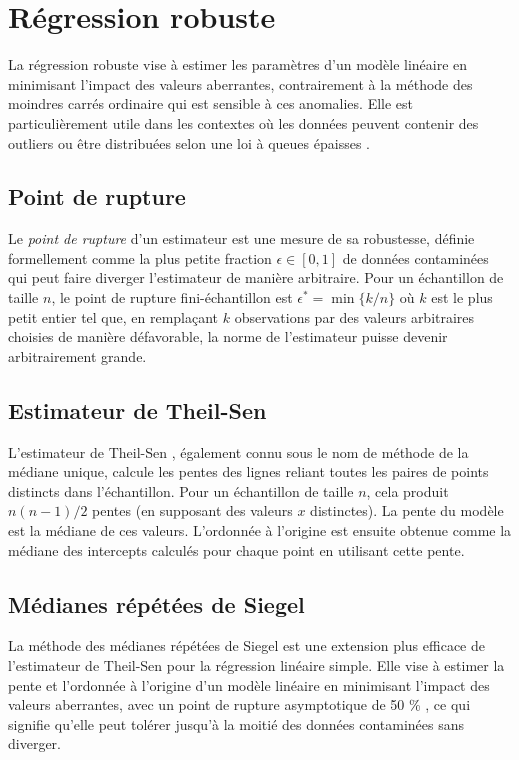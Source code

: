 \section{Régression robuste}
La régression robuste \citep{andersen2008modern} vise à estimer les paramètres d'un modèle linéaire en minimisant l'impact des valeurs aberrantes, contrairement à la méthode des moindres carrés ordinaire qui est sensible à ces anomalies. Elle est particulièrement utile dans les contextes où les données peuvent contenir des outliers ou être distribuées selon une loi à queues épaisses \citep{taleb2020statistical}.

\subsection{Point de rupture}
Le \emph{point de rupture} \citep{rousseeuw2003robust} d'un estimateur est une mesure de sa robustesse, définie formellement comme la plus petite fraction $\epsilon \in [0,1]$ de données contaminées qui peut faire diverger l'estimateur de manière arbitraire. Pour un échantillon de taille $n$, le point de rupture fini-échantillon est $\epsilon^* = \min\{k/n\}$ où $k$ est le plus petit entier tel que, en remplaçant $k$ observations par des valeurs arbitraires choisies de manière défavorable, la norme de l'estimateur puisse devenir arbitrairement grande.

\subsection{Estimateur de Theil-Sen}
L'estimateur de Theil-Sen \citep{theil1950rank, sen1968estimates}, également connu sous le nom de méthode de la médiane unique, calcule les pentes des lignes reliant toutes les paires de points distincts dans l'échantillon. Pour un échantillon de taille $n$, cela produit $n(n-1)/2$ pentes (en supposant des valeurs $x$ distinctes). La pente du modèle est la médiane de ces valeurs. L'ordonnée à l'origine est ensuite obtenue comme la médiane des intercepts calculés pour chaque point en utilisant cette pente.
 
\subsection{Médianes répétées de Siegel}
 La méthode des médianes répétées de Siegel \citep{siegel1982robust} est une extension plus efficace de l'estimateur de Theil-Sen pour la régression linéaire simple. Elle vise à estimer la pente et l'ordonnée à l'origine d'un modèle linéaire en minimisant l'impact des valeurs aberrantes, avec un point de rupture asymptotique de 50 \% \citep{rousseeuw2003robust}, ce qui signifie qu'elle peut tolérer jusqu'à la moitié des données contaminées sans diverger.
 
